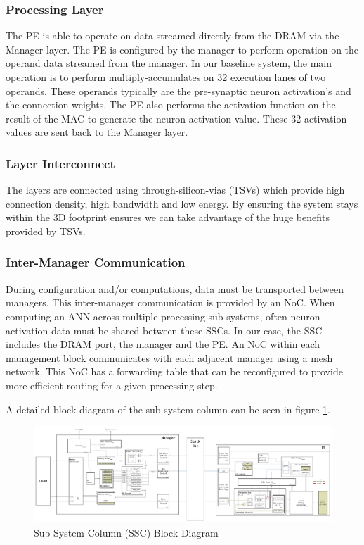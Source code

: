 \documentclass[journal]{IEEEtran}
\begin{document}
\subsubsection{Processing Layer}
\label{ssec:Processing Layer}
The PE is able to operate on data streamed directly from the DRAM via the Manager layer. The PE is configured by the manager to perform operation on the operand data streamed from the manager. In our baseline system, the main operation is to perform multiply-accumulates on 32 execution lanes of two operands. These operands typically are the pre-synaptic neuron activation's and the connection weights. The PE also performs the activation function on the result of the MAC to generate the neuron activation value. These 32 activation values are sent back to the Manager layer.

\subsubsection{Layer Interconnect}
\label{ssec:Layer Interconnect}

The layers are connected using through-silicon-vias (TSVs) which provide high connection density, high bandwidth and low energy.
By ensuring the system stays within the 3D footprint ensures we can take advantage of the huge benefits provided by TSVs.

\subsubsection{Inter-Manager Communication}
\label{ssec:Inter-Manager Communication}

During configuration and/or computations, data must be transported between managers. This inter-manager communication is provided by an NoC.
When computing an ANN across multiple processing sub-systems, often neuron activation data must be shared between these SSCs. In our case, the SSC includes the DRAM port, the manager and the PE. An NoC within each management block communicates with each adjacent manager using a mesh network. This NoC has a forwarding table that can be reconfigured to provide more efficient routing for a given processing step.

A detailed block diagram of the sub-system column can be seen in figure \ref{fig:DetailedBlockDiagram}.
\begin{figure}[!t]
\centering
\captionsetup{justification=centering}
\centerline{
\mbox{\includegraphics[width=6.0in]{DetailedBlockDiagram.jpg}}
}
\center\caption{Sub-System Column (SSC) Block Diagram}
\label{fig:DetailedBlockDiagram}
\end{figure}
\end{document}
